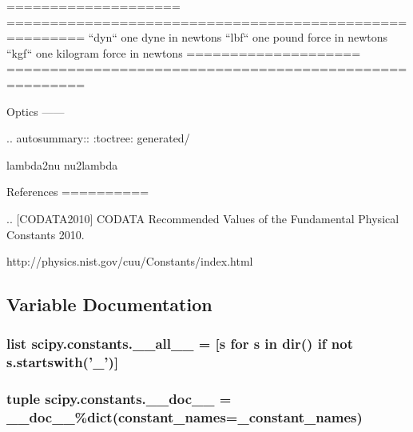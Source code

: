 \begin{DoxyVerb}
====================  =======================================================
``dyn``               one dyne in newtons
``lbf``               one pound force in newtons
``kgf``               one kilogram force in newtons
====================  =======================================================

Optics
------

.. autosummary::
   :toctree: generated/

   lambda2nu
   nu2lambda

References
==========

.. [CODATA2010] CODATA Recommended Values of the Fundamental
   Physical Constants 2010.

   http://physics.nist.gov/cuu/Constants/index.html\end{DoxyVerb}
 

\subsection{Variable Documentation}
\hypertarget{namespacescipy_1_1constants_aab236098483b3e189f4aada95bd3084f}{}
\subsubsection[{\+\_\+\+\_\+all\+\_\+\+\_\+}]{\setlength{\rightskip}{0pt plus 5cm}list scipy.\+constants.\+\_\+\+\_\+all\+\_\+\+\_\+ = \mbox{[}{\bf s} for {\bf s} in dir() {\bf if} not s.\+startswith('\+\_\+')\mbox{]}}\label{namespacescipy_1_1constants_aab236098483b3e189f4aada95bd3084f}
\hypertarget{namespacescipy_1_1constants_a083edbab749523d0373c761fed026093}{}
\subsubsection[{\+\_\+\+\_\+doc\+\_\+\+\_\+}]{\setlength{\rightskip}{0pt plus 5cm}tuple scipy.\+constants.\+\_\+\+\_\+doc\+\_\+\+\_\+ = \+\_\+\+\_\+doc\+\_\+\+\_\+\%dict(constant\+\_\+names={\bf \+\_\+constant\+\_\+names})}\label{namespacescipy_1_1constants_a083edbab749523d0373c761fed026093}
\hypertarget{namespacescipy_1_1constants_a391f23b56d1f395ddc55cdf4745095ff}{}

